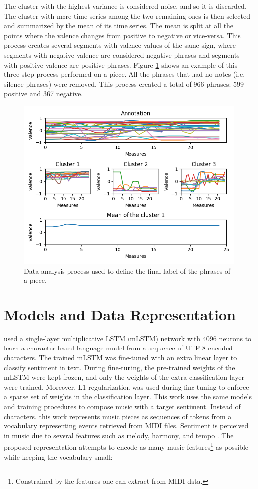 The cluster with the highest variance is considered noise, and so it is discarded. The cluster with more time series among the two remaining ones is then selected and summarized by the mean of its time series. The mean is split at all the points where the valence changes from positive to negative or vice-versa. This process creates several segments with valence values of the same sign, where segments with negative valence are considered negative phrases and segments with positive valence are positive phrases. Figure \ref{fig:clustering} shows an example of this three-step process performed on a piece. All the phrases that had no notes (i.e. silence phrases) were removed. This process created a total of 966 phrases: 599 positive and 367 negative.

\begin{figure}[!h]
 \centering
 \includegraphics[width=0.9\columnwidth]{imgs/ismir19/clustering.png}
 \caption{Data analysis process used to define the final label of the phrases of a piece. }
 \label{fig:clustering}
\end{figure}


\section{Models and Data Representation}
\label{sec:model}

\citet{radford_2017} used a single-layer multiplicative LSTM (mLSTM) network \cite{krause2017} with 4096 neurons to learn a character-based language model from a sequence of UTF-8 encoded characters. The trained mLSTM was fine-tuned with an extra linear layer to classify sentiment in text. During fine-tuning, the pre-trained weights of the mLSTM were kept frozen, and only the weights of the extra classification layer were trained. Moreover, L1 regularization was used during fine-tuning to enforce a sparse set of weights in the classification layer. This work uses the same models and training procedures to compose music with a target sentiment. Instead of characters, this work represents music pieces as sequences of tokens from a vocabulary representing events retrieved from MIDI files. Sentiment is perceived in music due to several features such as melody, harmony, and tempo \cite{kim2010music}. The proposed representation attempts to encode as many music features\footnote{Constrained by the features one can extract from MIDI data.} as possible while keeping the vocabulary small:

